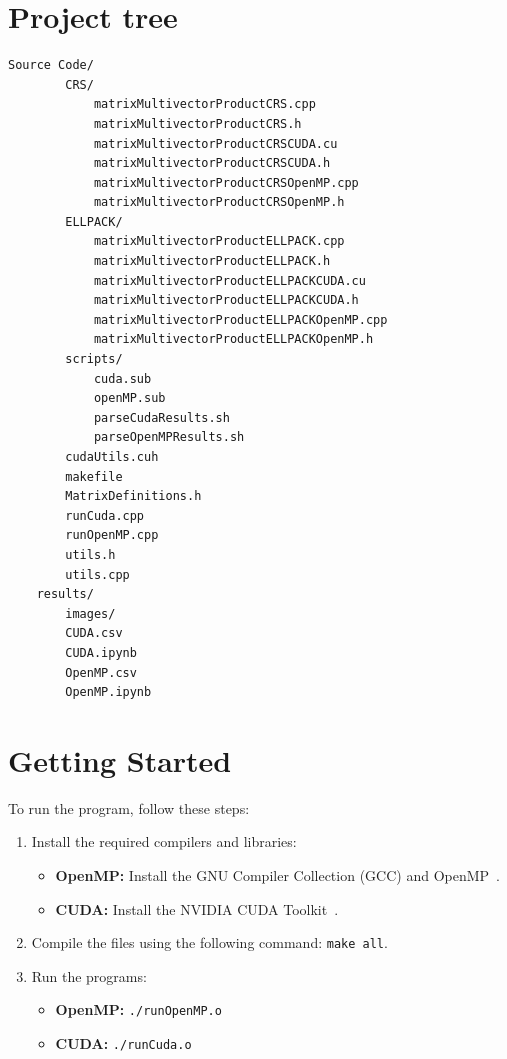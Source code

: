 \documentclass[12pt,oneside]{book} %
\begin{document}
\begin{subappendices}
    \section{Project tree}
    \begin{lstlisting}[breaklines=true, basicstyle=\small]
    Source Code/
        CRS/
            matrixMultivectorProductCRS.cpp
            matrixMultivectorProductCRS.h
            matrixMultivectorProductCRSCUDA.cu
            matrixMultivectorProductCRSCUDA.h
            matrixMultivectorProductCRSOpenMP.cpp
            matrixMultivectorProductCRSOpenMP.h
        ELLPACK/
            matrixMultivectorProductELLPACK.cpp
            matrixMultivectorProductELLPACK.h
            matrixMultivectorProductELLPACKCUDA.cu
            matrixMultivectorProductELLPACKCUDA.h
            matrixMultivectorProductELLPACKOpenMP.cpp
            matrixMultivectorProductELLPACKOpenMP.h
        scripts/
            cuda.sub
            openMP.sub
            parseCudaResults.sh
            parseOpenMPResults.sh
        cudaUtils.cuh
        makefile
        MatrixDefinitions.h
        runCuda.cpp
        runOpenMP.cpp
        utils.h
        utils.cpp
    results/
        images/
        CUDA.csv
        CUDA.ipynb
        OpenMP.csv
        OpenMP.ipynb
    \end{lstlisting}

    \section{Getting Started}
    To run the program, follow these steps:
    \begin{enumerate}
        \itemindent=17.87pt
        \item Install the required compilers and libraries:
              \begin{itemize}
                  \item \textbf{OpenMP:} Install the GNU Compiler Collection (GCC) and OpenMP~\cite{GCC}.
                  \item \textbf{CUDA:} Install the NVIDIA CUDA Toolkit~\cite{CUDA}.
              \end{itemize}
        \item Compile the files using the following command: \texttt{make all}.
        \item Run the programs:
              \begin{itemize}
                  \item \textbf{OpenMP:} \texttt{./runOpenMP.o}
                  \item  \textbf{CUDA:} \texttt{./runCuda.o}
              \end{itemize}
    \end{enumerate}


\end{subappendices}
\end{document}
